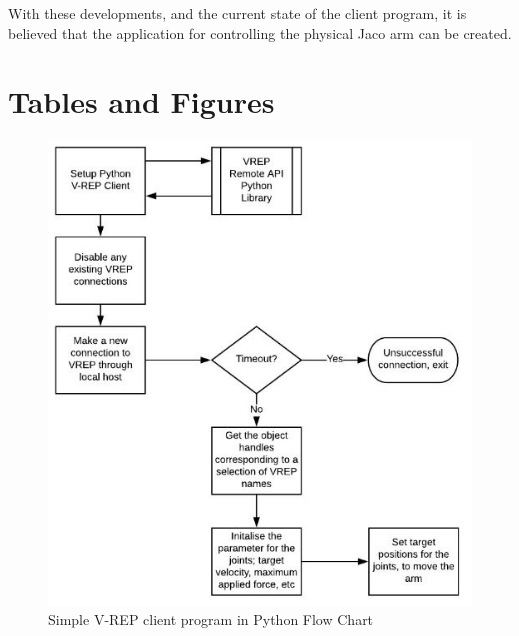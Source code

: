 \documentclass[12pt,openany,a4paper]{book}
\begin{document}
With these developments, and the current state of the client program, it is believed that the application for controlling the physical Jaco arm can be created.

\appendix


\newpage
{}
\mbox{}
\newpage



\chapter{Tables and Figures}

\begin{center}
\begin{figure}[htb]
  \includegraphics[width=0.8\linewidth]{python_flow_diagram.jpg}
\caption{Simple V-REP client program in Python Flow Chart}
\end{figure}
\end{center}
\end{document}
